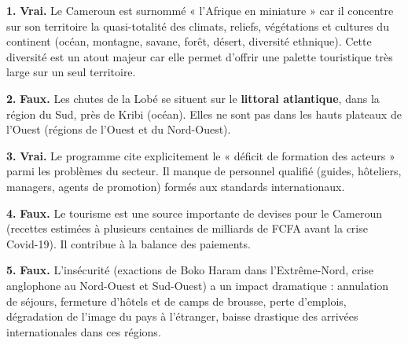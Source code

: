 \documentclass[11pt]{article}
\begin{document}
\begin{corrige}
\textbf{1.} \textbf{Vrai.} Le Cameroun est surnommé « l'Afrique en miniature » car il concentre sur son territoire la quasi-totalité des climats, reliefs, végétations et cultures du continent (océan, montagne, savane, forêt, désert, diversité ethnique). Cette diversité est un atout majeur car elle permet d'offrir une palette touristique très large sur un seul territoire.

\textbf{2.} \textbf{Faux.} Les chutes de la Lobé se situent sur le \textbf{littoral atlantique}, dans la région du Sud, près de Kribi (océan). Elles ne sont pas dans les hauts plateaux de l'Ouest (régions de l'Ouest et du Nord-Ouest).

\textbf{3.} \textbf{Vrai.} Le programme cite explicitement le « déficit de formation des acteurs » parmi les problèmes du secteur. Il manque de personnel qualifié (guides, hôteliers, managers, agents de promotion) formés aux standards internationaux.

\textbf{4.} \textbf{Faux.} Le tourisme est une source importante de devises pour le Cameroun (recettes estimées à plusieurs centaines de milliards de FCFA avant la crise Covid-19). Il contribue à la balance des paiements.

\textbf{5.} \textbf{Faux.} L'insécurité (exactions de Boko Haram dans l'Extrême-Nord, crise anglophone au Nord-Ouest et Sud-Ouest) a un impact dramatique : annulation de séjours, fermeture d'hôtels et de camps de brousse, perte d'emplois, dégradation de l'image du pays à l'étranger, baisse drastique des arrivées internationales dans ces régions.
\end{corrige}
\end{document}
